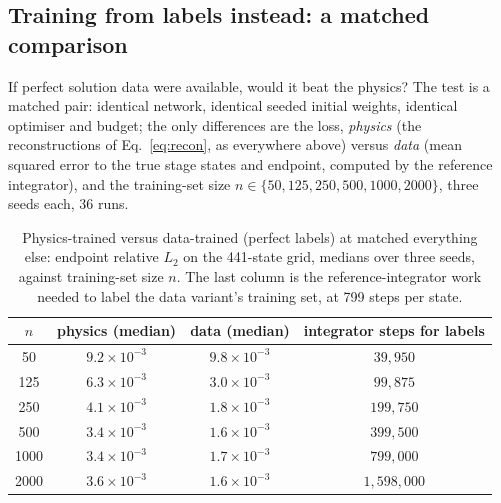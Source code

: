 \documentclass[11pt,a4paper]{article}
\begin{document}
\subsection{Training from labels instead: a matched comparison}
\label{sec:baseline}

If perfect solution data were available, would it beat the physics? The
test is a matched pair: identical network, identical seeded initial
weights, identical optimiser and budget; the only differences are the
loss, \emph{physics} (the reconstructions of Eq.~\eqref{eq:recon}, as
everywhere above) versus \emph{data} (mean squared error to the true
stage states and endpoint, computed by the reference integrator), and
the training-set size $n \in \{50, 125, 250, 500, 1000, 2000\}$, three
seeds each, 36 runs.

\begin{table}[tbp]
  \centering
  \caption{Physics-trained versus data-trained (perfect labels) at matched
  everything else: endpoint relative $L_2$ on the 441-state grid, medians
  over three seeds, against training-set size $n$. The last column is the
  reference-integrator work needed to label the data variant's training
  set, at 799 steps per state.}
  \label{tab:baseline}
  \small
  \begin{tabular}{cccc}
    \toprule
    $n$ & physics (median) & data (median) & integrator steps for labels \\
    \midrule
    50   & $9.2\times10^{-3}$ & $9.8\times10^{-3}$ & $39{,}950$ \\
    125  & $6.3\times10^{-3}$ & $3.0\times10^{-3}$ & $99{,}875$ \\
    250  & $4.1\times10^{-3}$ & $1.8\times10^{-3}$ & $199{,}750$ \\
    500  & $3.4\times10^{-3}$ & $1.6\times10^{-3}$ & $399{,}500$ \\
    1000 & $3.4\times10^{-3}$ & $1.7\times10^{-3}$ & $799{,}000$ \\
    2000 & $3.6\times10^{-3}$ & $1.6\times10^{-3}$ & $1{,}598{,}000$ \\
    \bottomrule
  \end{tabular}
\end{table}
\end{document}

